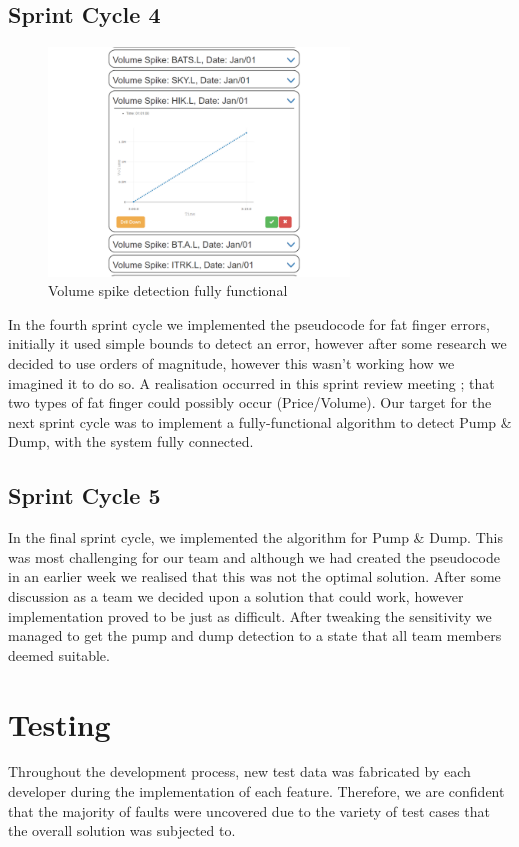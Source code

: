 \documentclass[12pt]{article}
\begin{document}
  \subsection{Sprint Cycle 4}
  \begin{figure}[H]
  \centering
  \includegraphics[width=80mm]{sprint4.png}
  \caption{Volume spike detection fully functional}
  \end{figure}
  In the fourth sprint cycle we implemented the pseudocode for fat finger errors, initially it used simple bounds to detect an error,
  however after some research  we decided to use orders of magnitude, however this wasn’t working how we imagined it to do so.
  A realisation occurred in this sprint review meeting ; that two types of fat finger could possibly occur (Price/Volume).
  Our target for the next sprint cycle was to implement a fully-functional algorithm to detect Pump \& Dump, with the system fully connected.
  \subsection{Sprint Cycle 5}
  In the final sprint cycle, we implemented the algorithm for Pump \& Dump.
  This was most challenging for our team and although we had created the pseudocode in an earlier week we realised that this was not the optimal solution.
  After some discussion as a team we decided upon a solution that could work, however implementation proved to be just as difficult.
  After tweaking the sensitivity we managed to get the pump and dump detection to a state that all team members deemed suitable.
\section{Testing}
  Throughout the development process, new test data was fabricated by each developer during the implementation of each feature.
  Therefore, we are confident that the majority of faults were uncovered due to the variety of test cases that the overall solution was subjected to.
\end{document}
